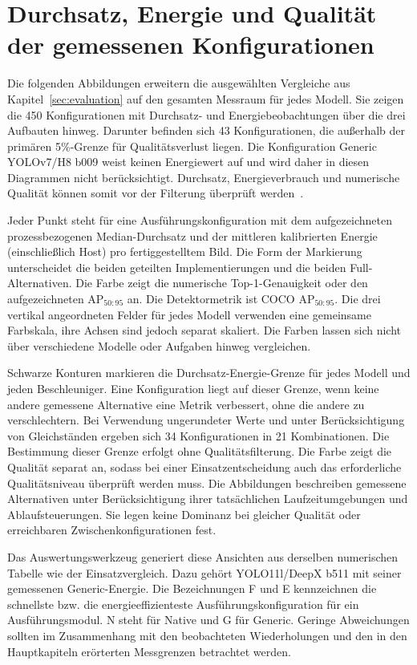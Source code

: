\section{Durchsatz, Energie und Qualität der gemessenen Konfigurationen}
\label{app:model_tradeoffs}

Die folgenden Abbildungen erweitern die ausgewählten Vergleiche aus Kapitel~\ref{sec:evaluation} auf den gesamten Messraum für jedes Modell. Sie zeigen die 450 Konfigurationen mit Durchsatz- und Energiebeobachtungen über die drei Aufbauten hinweg. Darunter befinden sich 43 Konfigurationen, die außerhalb der primären 5\%-Grenze für Qualitätsverlust liegen. Die Konfiguration Generic YOLOv7/H8 b009 weist keinen Energiewert auf und wird daher in diesen Diagrammen nicht berücksichtigt. Durchsatz, Energieverbrauch und numerische Qualität können somit vor der Filterung überprüft werden~\cite{edgeAIResults2026}.

Jeder Punkt steht für eine Ausführungskonfiguration mit dem aufgezeichneten prozessbezogenen Median-Durchsatz und der mittleren kalibrierten Energie (einschließlich Host) pro fertiggestelltem Bild. Die Form der Markierung unterscheidet die beiden geteilten Implementierungen und die beiden Full-Alternativen. Die Farbe zeigt die numerische Top-1-Genauigkeit oder den aufgezeichneten AP$_{50:95}$ an. Die Detektormetrik ist COCO AP$_{50:95}$. Die drei vertikal angeordneten Felder für jedes Modell verwenden eine gemeinsame Farbskala, ihre Achsen sind jedoch separat skaliert. Die Farben lassen sich nicht über verschiedene Modelle oder Aufgaben hinweg vergleichen.

Schwarze Konturen markieren die Durchsatz-Energie-Grenze für jedes Modell und jeden Beschleuniger. Eine Konfiguration liegt auf dieser Grenze, wenn keine andere gemessene Alternative eine Metrik verbessert, ohne die andere zu verschlechtern. Bei Verwendung ungerundeter Werte und unter Berücksichtigung von Gleichständen ergeben sich 34 Konfigurationen in 21 Kombinationen. Die Bestimmung dieser Grenze erfolgt ohne Qualitätsfilterung. Die Farbe zeigt die Qualität separat an, sodass bei einer Einsatzentscheidung auch das erforderliche Qualitätsniveau überprüft werden muss. Die Abbildungen beschreiben gemessene Alternativen unter Berücksichtigung ihrer tatsächlichen Laufzeitumgebungen und Ablaufsteuerungen. Sie legen keine Dominanz bei gleicher Qualität oder erreichbaren Zwischenkonfigurationen fest.

Das Auswertungswerkzeug generiert diese Ansichten aus derselben numerischen Tabelle wie der Einsatzvergleich. Dazu gehört YOLO11l/DeepX b511 mit seiner gemessenen Generic-Energie. Die Bezeichnungen F und E kennzeichnen die schnellste bzw. die energieeffizienteste Ausführungskonfiguration für ein Ausführungsmodul. N steht für Native und G für Generic. Geringe Abweichungen sollten im Zusammenhang mit den beobachteten Wiederholungen und den in den Hauptkapiteln erörterten Messgrenzen betrachtet werden.

